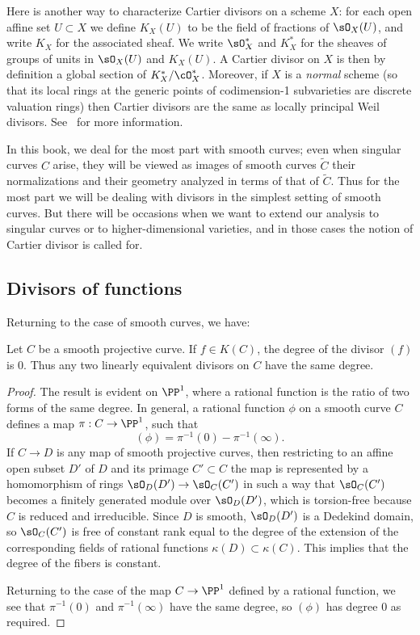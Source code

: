 Here is another way to characterize Cartier divisors on a scheme $X$: for each open affine set $U\subset X$ we define $K_X(U)$ to be the field of fractions of $\sO_X(U)$, and write $K_X$ for the
%
%
%
associated sheaf. We write $\sO_X^*$ and $K_X^*$ for the sheaves of groups of units in $\sO_X(U)$ and $K_X(U)$.
A Cartier divisor on $X$ is then by definition a global section of $K_X^*/\cO_X^*$. 
Moreover, if $X$ is a 
\emph{normal} scheme
(so that its local rings at
%
the generic points of codimension-1 subvarieties are discrete
valuation rings) then Cartier divisors are the same as locally
principal Weil divisors. See~\cite[Section II.6]{Hartshorne1977} for
more information. 

In this book, we  
deal
for the most part with smooth curves;
even when singular curves $C$ arise, they will be viewed as images of
smooth curves $\tilde C$
\redden{\emdash} 
their normalizations
\redden{\emdash} 
and their geometry
analyzed in terms of that of $\tilde C$. Thus for the most part we will
be dealing with divisors in the simplest setting of smooth curves. But
there will be occasions when we want to extend our analysis to
singular curves 
or to 
higher-dimensional varieties, and in those
cases the notion of Cartier divisor is called for. 

\subsection*{Divisors of functions}

Returning to the case of smooth curves, we have:

\begin{theorem}\label{degree defn}
Let $C$ be a smooth projective curve. If $f\in K(C)$, 
the degree of the divisor $(f)$ is $0$. 
Thus any two linearly equivalent divisors on $C$ have the
same degree.
\end{theorem}

\begin{proof}
 The result is evident on $\PP^1$, where a rational 
function is the ratio of two forms of the same degree. In general, a rational function $\phi$ on a smooth curve $C$ defines a map $\pi : C \to \PP^1$, such that
$$
(\phi) = \pi^{-1}(0) - \pi^{-1}(\infty).
$$
If $C\to D$ is any map of smooth projective curves, then restricting to an affine open subset $D'$ of $D$ and its primage
$C'\subset C$
the map is represented by a homomorphism of rings $\sO_D(D') \to \sO_C(C')$ in such a way that $\sO_C(C')$ becomes a finitely generated
module over $\sO_D(D')$, which is torsion-free because $C$ is reduced and irreducible. Since $D$ is smooth,
$\sO_D(D')$ is a Dedekind domain, so $\sO_C(C')$ is free of constant rank equal to the degree of the extension of the corresponding
 fields of rational functions $\kappa(D)\subset \kappa(C)$. This implies that the degree of the fibers is constant.
 
 Returning to the case of the map $C\to \PP^1$ defined by a rational function, we see that $\pi^{-1}(0)$ and $ \pi^{-1}(\infty)$
 have the same degree, so $(\phi)$ has degree 0 as required.
\end{proof}

